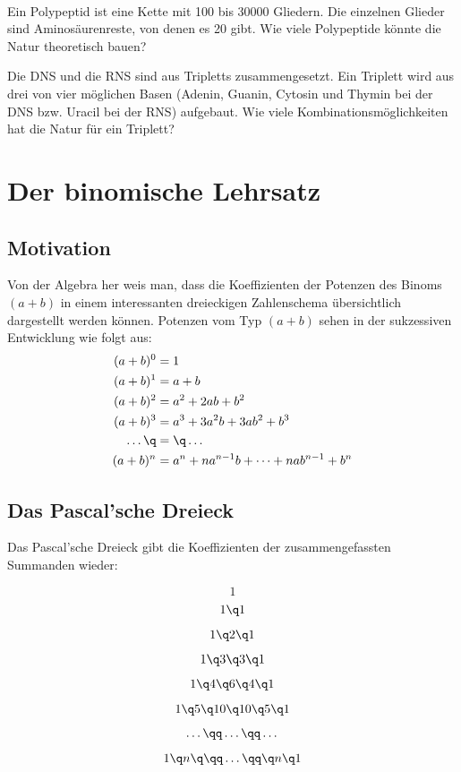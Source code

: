 \documentclass[%
11pt,%
twoside,%
titlepage,%
german,%
headsepline%
]{scrartcl}
\newcounter{theo}[section]\setcounter{theo}{0}
\begin{document}
\begin{ueb}[Polypeptide]
\ \\[-4ex]
\begin{enumeratea}
\item Ein Polypeptid ist eine Kette mit 100 bis 30000 Gliedern. Die einzelnen Glieder sind Aminosäurenreste, von denen es 20 gibt. Wie viele Polypeptide könnte die Natur theoretisch bauen?
\item Die DNS und die RNS sind aus Tripletts zusammengesetzt. Ein Triplett wird aus drei von vier möglichen Basen (Adenin, Guanin, Cytosin und Thymin bei der DNS bzw. Uracil bei der RNS) aufgebaut. Wie viele Kombinationsmöglichkeiten hat die Natur für ein Triplett?
\end{enumeratea}
\end{ueb}

\clearpage

\section{Der binomische Lehrsatz} \label{app:binomial}

\subsection{Motivation}

Von der Algebra her weis man, dass die Koeffizienten der Potenzen des Binoms $(a+b)$ in einem interessanten dreieckigen Zahlenschema übersichtlich dargestellt werden können.
Potenzen vom Typ $(a+b)$ sehen in der sukzessiven Entwicklung wie folgt aus:
\begin{align*}
(a+b)^0&=1\\
(a+b)^1&=a+b\\
(a+b)^2&=a^2+2ab+b^2\\
(a+b)^3&=a^3+3a^2b+3ab^2+b^3\\
\dots\q &= \q\dots\\
(a+b)^n&=a^n+na^{n-1}b+\dots+nab^{n-1}+b^n
\end{align*}

\subsection{Das Pascal'sche Dreieck}

Das Pascal'sche Dreieck gibt die Koeffizienten der zusammengefassten Summanden wieder:\\[-5ex]
\begin{center}
$$1$$
$$1\q1$$
$$1\q2\q1$$
$$1\q3\q3\q1$$
$$1\q4\q6\q4\q1$$
$$1\q5\q10\q10\q5\q1$$
$$\dots\qq\dots\qq\dots$$
$$1\q n\q\qq\dots\qq\q n\q1$$
\end{center}
\end{document}
